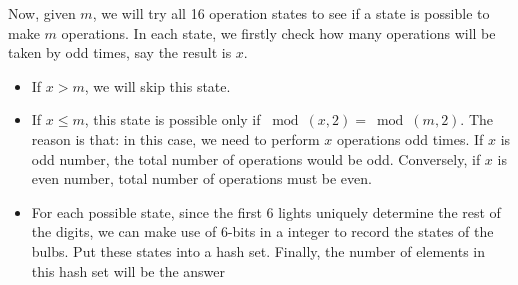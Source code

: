 Now, given $m$, we will try all 16 operation states to see if a state is possible to make $m$ operations. In each state, we firstly check how many operations will be taken by odd times, say the result is $x$.
\begin{itemize}
\item If $x > m$, we will skip this state.
\item If $x \leq m$, this state is possible only if $\bmod(x, 2)=\bmod(m,2)$. The reason is that: in this case, we need to perform $x$ operations odd times. If $x$ is odd number, the total number of operations would be odd. Conversely, if $x$ is even number, total number of operations must be even.  


\item For each possible state, since the first 6 lights uniquely determine the rest of the digits, we can make use of 6-bits in a integer to record the states of the bulbs. Put these states into a hash set. Finally, the number of elements in this hash set will be the answer
\end{itemize}

